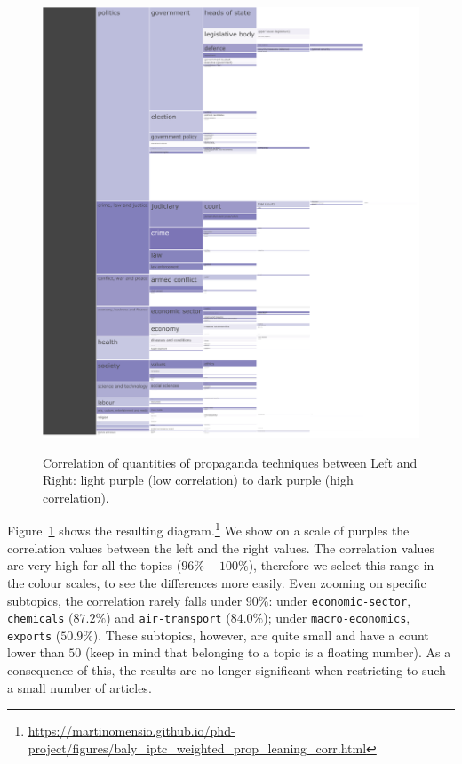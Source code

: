 \begin{figure}[!htbp]
    \centering
    \href{https://martinomensio.github.io/phd-project/figures/baly_iptc_weighted_prop_leaning_corr.html}{\includegraphics[trim={2.65cm 0cm 0cm 0cm},clip,width=\linewidth]{figures/baly_iptc_weighted_prop_leaning_corr.pdf}}
    \caption{Correlation of quantities of propaganda techniques between Left and Right: light purple (low correlation) to dark purple (high correlation).}
    \label{fig:baly_iptc_weighted_prop_leaning_corr}
\end{figure}

Figure~\ref{fig:baly_iptc_weighted_prop_leaning_corr} shows the resulting diagram.\footnote{\url{https://martinomensio.github.io/phd-project/figures/baly_iptc_weighted_prop_leaning_corr.html}}
We show on a scale of purples the correlation values between the left and the right values.
The correlation values are very high for all the topics ($96\% - 100\%$), therefore we select this range in the colour scales, to see the differences more easily.
Even zooming on specific subtopics, the correlation rarely falls under $90\%$: under \texttt{economic-sector}, \texttt{chemicals} ($87.2\%$) and \texttt{air-transport} ($84.0\%$); under \texttt{macro-economics}, \texttt{exports} ($50.9\%$). 
These subtopics, however, are quite small and have a count lower than $50$ (keep in mind that belonging to a topic is a floating number). As a consequence of this, the results are no longer significant when restricting to such a small number of articles.

